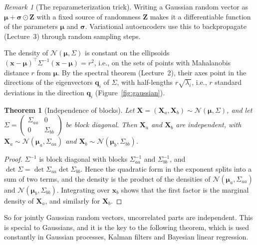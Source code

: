 \documentclass[11pt]{article}
\theoremstyle{definition}
\theoremstyle{plain}
\newtheorem{theorem}[definition]{Theorem}
\theoremstyle{remark}
\newtheorem{remark}[definition]{Remark}
\begin{document}
\begin{remark}[The reparameterization trick]
    Writing a Gaussian random vector as $\boldsymbol{\mu} + \boldsymbol{\sigma} \odot \mathbf{Z}$ with a fixed source of randomness $\mathbf{Z}$ makes it a differentiable function of the parameters $\boldsymbol{\mu}$ and $\boldsymbol{\sigma}$. Variational autoencoders use this to backpropagate (Lecture~3) through random sampling steps.
\end{remark}

The density of $\mathcal{N}(\boldsymbol{\mu}, \Sigma)$ is constant on the ellipsoids $(\mathbf{x} - \boldsymbol{\mu})^\top\Sigma^{-1}(\mathbf{x} - \boldsymbol{\mu}) = r^2$, i.e., on the sets of points with Mahalanobis distance $r$ from $\boldsymbol{\mu}$. By the spectral theorem (Lecture~2), their axes point in the directions of the eigenvectors $\mathbf{q}_i$ of $\Sigma$, with half-lengths $r\sqrt{\lambda_i}$, i.e., $r$ standard deviations in the direction $\mathbf{q}_i$ (Figure~\ref{fig:gaussian}).

\begin{theorem}[Independence of blocks]\label{thm:gaussian-blocks}
    Let $\mathbf{X} = (\mathbf{X}_a, \mathbf{X}_b) \sim \mathcal{N}(\boldsymbol{\mu}, \Sigma)$, and let $\Sigma = \left(\begin{smallmatrix} \Sigma_{aa} & 0 \\ 0 & \Sigma_{bb} \end{smallmatrix}\right)$ be block diagonal. Then $\mathbf{X}_a$ and $\mathbf{X}_b$ are independent, with $\mathbf{X}_a \sim \mathcal{N}(\boldsymbol{\mu}_a, \Sigma_{aa})$ and $\mathbf{X}_b \sim \mathcal{N}(\boldsymbol{\mu}_b, \Sigma_{bb})$.
\end{theorem}

\begin{proof}
    $\Sigma^{-1}$ is block diagonal with blocks $\Sigma_{aa}^{-1}$ and $\Sigma_{bb}^{-1}$, and $\det\Sigma = \det\Sigma_{aa}\det\Sigma_{bb}$. Hence the quadratic form in the exponent splits into a sum of two terms, and the density is the product of the densities of $\mathcal{N}(\boldsymbol{\mu}_a, \Sigma_{aa})$ and $\mathcal{N}(\boldsymbol{\mu}_b, \Sigma_{bb})$. Integrating over $\mathbf{x}_b$ shows that the first factor is the marginal density of $\mathbf{X}_a$, and similarly for $\mathbf{X}_b$.
\end{proof}

So for jointly Gaussian random vectors, uncorrelated parts are independent. This is special to Gaussians, and it is the key to the following theorem, which is used constantly in Gaussian processes, Kalman filters and Bayesian linear regression.
\end{document}
